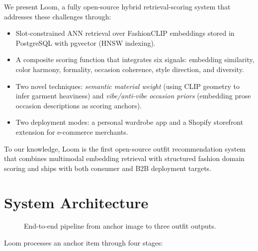 \documentclass[sigconf]{acmart}
\begin{document}
We present Loom, a fully open-source hybrid retrieval-scoring system that
addresses these challenges through:
\begin{itemize}
\item Slot-constrained ANN retrieval over FashionCLIP embeddings stored
  in PostgreSQL with pgvector (HNSW indexing).
\item A composite scoring function that integrates six signals: embedding
  similarity, color harmony, formality, occasion coherence, style direction,
  and diversity.
\item Two novel techniques: \emph{semantic material weight} (using CLIP
  geometry to infer garment heaviness) and \emph{vibe/anti-vibe occasion
  priors} (embedding prose occasion descriptions as scoring anchors).
\item Two deployment modes: a personal wardrobe app and a Shopify
  storefront extension for e-commerce merchants.
\end{itemize}

To our knowledge, Loom is the first open-source outfit recommendation
system that combines multimodal embedding retrieval with structured
fashion domain scoring and ships with both consumer and B2B deployment
targets.

\section{System Architecture}

\begin{figure}[t]
\centering
{}
\caption{End-to-end pipeline from anchor image to three outfit outputs.}
\label{fig:pipeline}
\end{figure}

Loom processes an anchor item through four stages:
\end{document}
